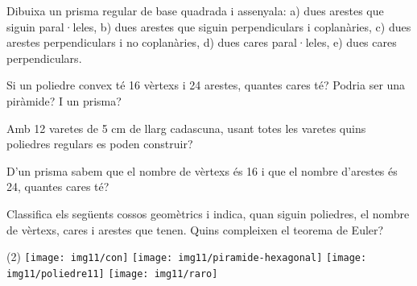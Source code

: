 \begin{activitats}
\begin{mylist}
\exer  Dibuixa un prisma regular de base quadrada i assenyala: a) dues arestes que siguin paral·leles, b) dues arestes que siguin perpendiculars i coplanàries, c) dues arestes perpendiculars i no coplanàries, d) dues cares paral·leles, e) dues cares perpendiculars.

\exer  Si un poliedre convex té 16 vèrtexs i 24 arestes, quantes cares té? Podria ser una piràmide? I un prisma?

\exer  Amb 12 varetes de 5 cm de llarg cadascuna, usant totes les varetes quins poliedres regulars es poden construir?

\exer  D'un prisma sabem que el nombre de vèrtexs és 16 i que el nombre d'arestes és 24, quantes cares té?

\exer  Classifica els següents cossos geomètrics i indica, quan siguin poliedres, el nombre de vèrtexs, cares i arestes que tenen. Quins compleixen el teorema de Euler?
\begin{tasks}(2) 
\task \texttt{[image: img11/con]}
\task \texttt{[image: img11/piramide-hexagonal]}
\task \texttt{[image: img11/poliedre11]}
\task \texttt{[image: img11/raro]}
\end{tasks}


\end{mylist}
\end{activitats}
